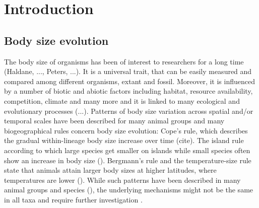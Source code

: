 \section{Introduction}
\subsection{Body size evolution}

The body size of organisms has been of interest to researchers for a long time (Haldane, ..., Peters, ...). It is a universal trait, that can be easily measured and compared among different organisms, extant and fossil. Moreover, it is influenced by a number of biotic and abiotic factors including habitat, resource availability, competition, climate and many more and it is linked to many ecological and evolutionary processes (...).
Patterns of body size variation across spatial and/or temporal scales have been described for many animal groups and many biogeographical rules concern body size evolution: Cope's rule, which describes the gradual within-lineage body size increase over time (cite). The island rule according to which large species get smaller on islands while small species often show an increase in body size (). Bergmann's rule and the temperature-size rule state that animals attain larger body sizes at higher latitudes, where temperatures are lower ().
While such patterns have been described in many animal groups and species (), the underlying mechanisms might not be the same in all taxa and require further investigation \citep{Smith2009}.





